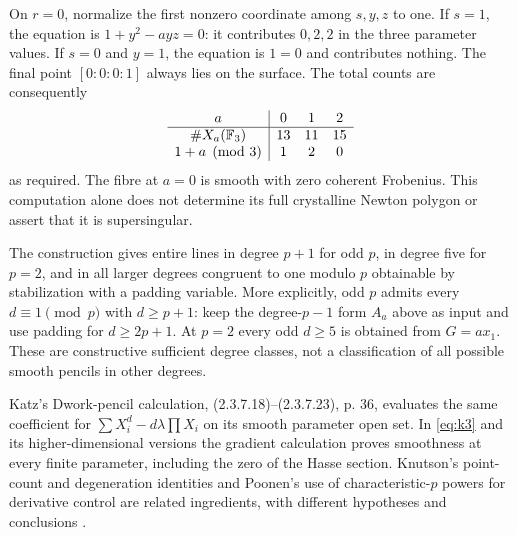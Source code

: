 On $r=0$, normalize the first nonzero coordinate among $s,y,z$ to one. If $s=1$, the equation is $1+y^2-a y z=0$: it contributes $0,2,2$ in the three parameter values. If $s=0$ and $y=1$, the equation is $1=0$ and contributes nothing. The final point $[0:0:0:1]$ always lies on the surface. The total counts are consequently
\[
\begin{array}{c|ccc}
a&0&1&2\\\hline
\#X_a(\mathbb F_3)&13&11&15\\
1+a\pmod3&1&2&0
\end{array}
\]
as required. The fibre at $a=0$ is smooth with zero coherent Frobenius. This computation alone does not determine its full crystalline Newton polygon or assert that it is supersingular.

The construction gives entire lines in degree $p+1$ for odd $p$, in degree five for $p=2$, and in all larger degrees congruent to one modulo $p$ obtainable by stabilization with a padding variable. More explicitly, odd $p$ admits every $d\equiv1\pmod p$ with $d\ge p+1$: keep the degree-$p-1$ form $A_a$ above as input and use padding for $d\ge2p+1$. At $p=2$ every odd $d\ge5$ is obtained from $G=ax_1$. These are constructive sufficient degree classes, not a classification of all possible smooth pencils in other degrees.

Katz's Dwork-pencil calculation, (2.3.7.18)--(2.3.7.23), p. 36, evaluates the same coefficient for $\sum X_i^d-d\lambda\prod X_i$ on its smooth parameter open set. In \eqref{eq:k3} and its higher-dimensional versions the gradient calculation proves smoothness at every finite parameter, including the zero of the Hasse section. Knutson's point-count and degeneration identities and Poonen's use of characteristic-$p$ powers for derivative control are related ingredients, with different hypotheses and conclusions \citep[Theorems 1--2]{core-knutson}\citep[\S2.3]{core-poonen}.

